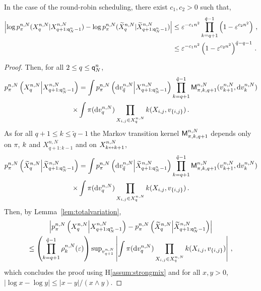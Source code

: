 \begin{remark}
\label{rem:forgetting:tildeX}
In the case of the round-robin scheduling, there exist $c_1,c_2 >0$ such that,
\begin{align*}
\left|\log p_{\pi}^{n,N}(X_{q}^{n,N}|X_{q+1:{\mathsf{q}}^{n}_{N}-1}^{n,N}) - \log p_{\pi}^{n,N}(\widetilde{X}_{q}^{n,N}|\widetilde{X}_{q+1:{\mathsf{q}}^{n}_{N}-1}^{n,N})\right| &\leq \varepsilon^{-c_1n^2}\prod_{k=q+1}^{\tilde{q}-1}\left(1-\varepsilon^{c_2n^2}\right) \,,\\
&\le  \varepsilon^{-c_1n^2}\left(1-\varepsilon^{c_2n^2}\right)^{\tilde{q}-q-1}\,. 
\end{align*}
\end{remark}

\begin{proof}
Then, for all $2\le q \le {\mathsf{q}}^{n}_{N}$,
\begin{multline*}
p_{\pi}^{n,N}\left(X^{n,N}_{q}\middle|X^{n,N}_{q+1:{\mathsf{q}}^{n}_{N}-1}\right) = \int p^{n,N}_{\pi}\left(\mathrm{d} v_{\tilde{q}}^{n,N}\middle | X^{n,N}_{q+1:{\mathsf{q}}^{n}_{N}-1}\right) \prod_{k = q+1}^{\tilde{q}-1}\mathsf{M}^{n,N}_{\pi,k,q+1}(v_{k+1}^{n,N},\mathrm{d} v_k^{n,N})\\
\times\int \pi(\mathrm{d} v_q^{n,N})\prod_{X_{i,j}\in X_{q}^{n,N}}k(X_{i,j},v_{\{i,j\}})\,.
\end{multline*}
As for all $q+1\le k\le \tilde{q}-1$ the Markov transition kernel $\mathsf{M}^{n,N}_{\pi,k,q+1}$ depends only on $\pi$, $k$ and $X^{n,N}_{q+1:k-1}$ and on $X^{n,N}_{k\leftrightarrow k+1}$,  
\begin{multline*}
p_{\pi}^{n,N}\left(\widetilde{X}^{n,N}_{q}\middle|\widetilde{X}^{n,N}_{q+1:{\mathsf{q}}^{n}_{N}-1}\right) = \int p^{n,N}_{\pi}\left(\mathrm{d} v_{\tilde{q}}^{n,N}\middle | \widetilde{X}^{n,N}_{q+1:{\mathsf{q}}^{n}_{N}-1}\right) \prod_{k = q+1}^{\tilde{q}-1}\mathsf{M}^{n,N}_{\pi,k,q+1}(v_{k+1}^{n,N},\mathrm{d} v_k^{n,N})\\
\times\int \pi(\mathrm{d} v_q^{n,N})\prod_{X_{i,j}\in X_{q}^{n,N}}k(X_{i,j},v_{\{i,j\}})\,.
\end{multline*}
Then, by Lemma~\ref{lem:totalvariation}, 
\begin{multline*}
\left|p_{\pi}^{n,N}\left(X^{n,N}_{q}\middle|X^{n,N}_{q+1:{\mathsf{q}}^{n}_{N}-1}\right)-p_{\pi}^{n,N}\left(\widetilde{X}^{n,N}_{q}\middle|\widetilde{X}^{n,N}_{q+1:{\mathsf{q}}^{n}_{N}-1}\right)\right| \\
\le \left(\prod_{k = q+1}^{\tilde{q}-1}\rho^{n,N}_k(\varepsilon)\right) \mathrm{sup}_{v^{n,N}_{q+1}}\left|\int\pi(\mathrm{d} v^{n,N}_q)\prod_{X_{i,j}\in X_{q}^{n,N}}k(X_{i,j},v_{\{i,j\}})\right|\,,
\end{multline*}
which concludes the proof using H\ref{assum:strongmix} and for all $x,y>0$, $|\log x - \log y|\le  |x-y|/(x\wedge y)$.
\end{proof}

